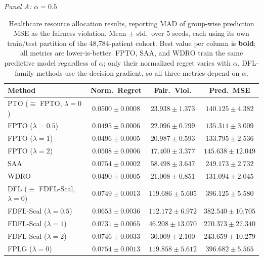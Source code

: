 \documentclass[ijoc,sglanonrev]{informs4}
\begin{document}
\begin{table}[htbp]
\centering
\caption{Healthcare resource allocation results, reporting MAD of group-wise prediction MSE as
the fairness violation. Mean $\pm$ std.\ over 5 seeds, each using its own train/test partition of
the 48{,}784-patient cohort. Best value per column is \textbf{bold}; all metrics are
lower-is-better. FPTO, SAA, and WDRO train the same predictive model regardless of $\alpha$;
only their normalized regret varies with $\alpha$. DFL-family methods use the decision gradient,
so all three metrics depend on $\alpha$.}
\label{tab:healthcare}
\footnotesize
\setlength{\tabcolsep}{5pt}

\smallskip
\textit{Panel A: $\alpha = 0.5$}

\smallskip
\begin{tabular}{l ccc}
\toprule
Method & Norm.\ Regret & Fair.\ Viol. & Pred.\ MSE \\
\midrule
PTO ($\equiv$ FPTO, $\lambda\!=\!0$)      & $0.0500 \pm 0.0008$ & $23.938 \pm 1.373$ & $140.125 \pm 4.382$ \\
FPTO ($\lambda\!=\!0.5$)                  & $0.0495 \pm 0.0006$ & $22.096 \pm 0.799$ & $135.311 \pm 3.009$ \\
FPTO ($\lambda\!=\!1$)                    & $0.0496 \pm 0.0005$ & $20.987 \pm 0.593$ & $\mathbf{133.795 \pm 2.536}$ \\
FPTO ($\lambda\!=\!2$)                    & $0.0508 \pm 0.0006$ & $\mathbf{17.400 \pm 3.377}$ & $145.638 \pm 12.049$ \\
\midrule
SAA                                       & $0.0754 \pm 0.0002$ & $58.498 \pm 3.647$ & $249.173 \pm 2.732$ \\
WDRO                                      & $0.0490 \pm 0.0005$ & $21.008 \pm 0.851$ & $131.094 \pm 2.045$ \\
\midrule
DFL ($\equiv$ FDFL-Scal, $\lambda\!=\!0$) & $0.0749 \pm 0.0013$ & $119.686 \pm 5.605$ & $396.125 \pm 5.580$ \\
FDFL-Scal ($\lambda\!=\!0.5$)             & $0.0653 \pm 0.0036$ & $112.172 \pm 6.972$ & $382.540 \pm 10.705$ \\
FDFL-Scal ($\lambda\!=\!1$)               & $0.0731 \pm 0.0065$ & $46.208 \pm 13.070$ & $270.373 \pm 27.340$ \\
FDFL-Scal ($\lambda\!=\!2$)               & $0.0746 \pm 0.0033$ & $30.009 \pm 2.100$ & $243.659 \pm 10.279$ \\
\midrule
FPLG ($\lambda\!=\!0$)                    & $0.0754 \pm 0.0013$ & $119.858 \pm 5.612$ & $396.682 \pm 5.565$ \\

\end{tabular}
\end{table}
\end{document}
